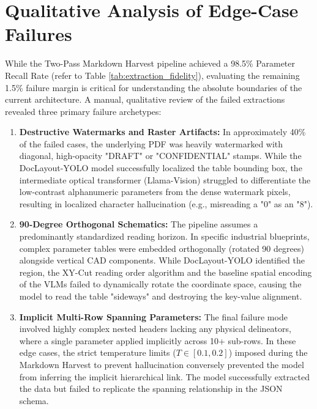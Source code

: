 \section{Qualitative Analysis of Edge-Case Failures}
\label{sec:qualitative_analysis}

While the Two-Pass Markdown Harvest pipeline achieved a 98.5\% Parameter Recall Rate (refer to Table \ref{tab:extraction_fidelity}), evaluating the remaining 1.5\% failure margin is critical for understanding the absolute boundaries of the current architecture. A manual, qualitative review of the failed extractions revealed three primary failure archetypes:

\begin{enumerate}
    \item \textbf{Destructive Watermarks and Raster Artifacts:} In approximately 40\% of the failed cases, the underlying PDF was heavily watermarked with diagonal, high-opacity "DRAFT" or "CONFIDENTIAL" stamps. While the DocLayout-YOLO model successfully localized the table bounding box, the intermediate optical transformer (Llama-Vision) struggled to differentiate the low-contrast alphanumeric parameters from the dense watermark pixels, resulting in localized character hallucination (e.g., misreading a "0" as an "8").
    
    \item \textbf{90-Degree Orthogonal Schematics:} The pipeline assumes a predominantly standardized reading horizon. In specific industrial blueprints, complex parameter tables were embedded orthogonally (rotated 90 degrees) alongside vertical CAD components. While DocLayout-YOLO identified the region, the XY-Cut reading order algorithm and the baseline spatial encoding of the VLMs failed to dynamically rotate the coordinate space, causing the model to read the table "sideways" and destroying the key-value alignment.
    
    \item \textbf{Implicit Multi-Row Spanning Parameters:} The final failure mode involved highly complex nested headers lacking any physical delineators, where a single parameter applied implicitly across 10+ sub-rows. In these edge cases, the strict temperature limits ($T \in [0.1, 0.2]$) imposed during the Markdown Harvest to prevent hallucination conversely prevented the model from inferring the implicit hierarchical link. The model successfully extracted the data but failed to replicate the spanning relationship in the JSON schema.
\end{enumerate}


